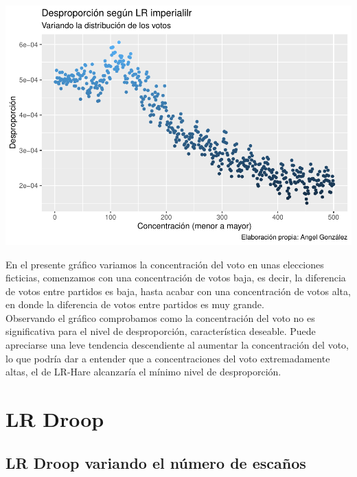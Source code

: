 \documentclass[12pt,a4paper,]{book}
\numberwithin{dummy}{section}
\theoremstyle{ocrenumbox}
\theoremstyle{blacknumex}
\theoremstyle{blacknumbox}
\theoremstyle{ocrenum}
\theoremstyle{ocrenum}
\begin{document}
\begin{center}\includegraphics[width=0.95\linewidth]{figurasR/unnamed-chunk-53-1} \end{center}

En el presente gráfico variamos la concentración del voto en unas
elecciones ficticias, comenzamos con una concentración de votos baja, es
decir, la diferencia de votos entre partidos es baja, hasta acabar con
una concentración de votos alta, en donde la diferencia de votos entre
partidos es muy grande.\\
Observando el gráfico comprobamos como la concentración del voto no es
significativa para el nivel de desproporción, característica deseable.
Puede apreciarse una leve tendencia descendiente al aumentar la
concentración del voto, lo que podría dar a entender que a
concentraciones del voto extremadamente altas, el de LR-Hare alcanzaría
el mínimo nivel de desproporción.

\hypertarget{lr-droop}{%
\section{LR Droop}\label{lr-droop}}

\hypertarget{lr-droop-variando-el-nuxfamero-de-escauxf1os}{%
\subsection{LR Droop variando el número de
escaños}\label{lr-droop-variando-el-nuxfamero-de-escauxf1os}}
\end{document}
